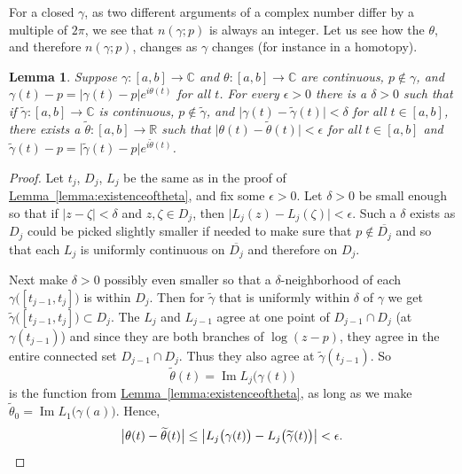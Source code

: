 \documentclass[12pt,openany]{book}
\renewcommand{\Im}{\operatorname{Im}}
\newcommand{\sabs}[1]{\lvert {#1} \rvert}
\newcommand{\babs}[1]{\bigl\lvert {#1} \bigr\rvert}
\newcommand{\C}{{\mathbb{C}}}
\newcommand{\R}{{\mathbb{R}}}
\theoremstyle{plain}
\newtheorem{lemma}[thm]{Lemma}
\theoremstyle{remark}
\theoremstyle{definition}
\theoremstyle{exercise}
\theoremstyle{example}
\newcommand{\lemmaref}[1]{\hyperref[#1]{Lemma~\ref*{#1}}}
\begin{document}
For a closed $\gamma$, as two different arguments of a complex number differ by
a multiple of $2 \pi$, we see that $n(\gamma;p)$ is always an integer.
Let us see how the $\theta$, and therefore $n(\gamma;p)$, changes 
as $\gamma$ changes (for instance in a homotopy).

\begin{lemma} \label{lemma:changeintheta}
Suppose $\gamma \colon [a,b] \to \C$ and $\theta \colon [a,b] \to \C$
are continuous, $p \notin \gamma$,
and $\gamma(t)-p = \sabs{\gamma(t)-p} e^{i\theta(t)}$ for all $t$.
For every $\epsilon > 0$ there is a $\delta > 0$ such that
if $\widetilde{\gamma} \colon [a,b] \to \C$ is continuous,
$p \notin \widetilde{\gamma}$, and
$\sabs{\gamma(t)-\widetilde{\gamma}(t)} < \delta$ for all $t \in [a,b]$,
there exists a $\widetilde{\theta} \colon [a,b] \to \R$ such that
$\sabs{\theta(t)-\widetilde{\theta}(t)} < \epsilon$ for all $t \in [a,b]$
and $\widetilde{\gamma}(t)-p = \sabs{\widetilde{\gamma}(t)-p}
e^{i\widetilde{\theta}(t)}$.
\end{lemma}

\begin{proof}
Let $t_j$, $D_j$, $L_j$ be the same as in the proof of
\lemmaref{lemma:existenceoftheta}, and fix some $\epsilon > 0$.
Let $\delta > 0$ be small enough so that if $\sabs{z-\zeta}
< \delta$ and $z,\zeta \in D_j$, then $\sabs{L_j(z)-L_j(\zeta)} < \epsilon$.
Such a $\delta$ exists as $D_j$ could be picked slightly smaller if needed
to make sure that $p \not\in \overline{D_j}$ and so that each $L_j$
is uniformly continuous on $\overline{D_j}$ and therefore on $D_j$.

Next make $\delta > 0$ possibly even smaller so that a $\delta$-neighborhood of each
$\gamma\bigl([t_{j-1},t_j]\bigr)$ is within $D_j$.  Then
for $\widetilde{\gamma}$ that is uniformly within $\delta$ of $\gamma$ we
get
$\widetilde{\gamma}\bigl([t_{j-1},t_j]\bigr) \subset D_j$.
The $L_j$ and $L_{j-1}$ agree at one point of $D_{j-1} \cap D_j$ (at
$\gamma(t_{j-1})$) and since they are both branches of $\log (z-p)$, they
agree in the entire connected set $D_{j-1} \cap D_j$.  Thus they also
agree at $\widetilde{\gamma}(t_{j-1})$.
So
\begin{equation*}
\widetilde{\theta}(t)
=
\Im L_j\bigl(\gamma(t)\bigr)
\end{equation*}
is the function from \lemmaref{lemma:existenceoftheta}, as long as we make
$\widetilde{\theta}_0 = \Im L_1\bigl(\gamma(a)\bigr)$.
Hence,
\begin{equation*}
\babs{\theta(t) - \widetilde{\theta}(t)}
\leq
\babs{
L_j\bigl(\gamma(t)\bigr)
-
L_j\bigl(\widetilde{\gamma}(t)\bigr)
}
< \epsilon. \qedhere
\end{equation*}
\end{proof}
\end{document}
